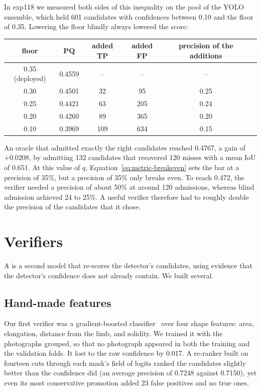 In exp118 we measured both sides of this inequality on the pool of the YOLO ensemble, which held 601
candidates with confidences between 0.10 and the floor of 0.35. Lowering the floor blindly always
lowered the score:
\begin{center}\small
\begin{tabular}{@{}cccccc@{}}
\toprule
floor & PQ & added TP & added FP & precision of the additions \\
\midrule
0.35 (deployed) & 0.4559 & -- & -- & -- \\
0.30 & 0.4501 & 32 & 95 & 0.25 \\
0.25 & 0.4421 & 63 & 205 & 0.24 \\
0.20 & 0.4260 & 89 & 365 & 0.20 \\
0.10 & 0.3969 & 109 & 634 & 0.15 \\
\bottomrule
\end{tabular}
\end{center}
An oracle that admitted exactly the right candidates reached 0.4767, a gain of $+0.0208$, by admitting
132 candidates that recovered 120 misses with a mean IoU of 0.651. At this value of $q$,
Equation~\eqref{eq:metric-breakeven} sets the bar at a precision of 35\%, but a precision of 35\%
only breaks even. To reach 0.472, the verifier needed a precision of about 50\% at around 120
admissions, whereas blind admission achieved 24 to 25\%. A useful verifier therefore had to roughly
double the precision of the candidates that it chose.

\section{Verifiers}\label{sec:recall-verifiers}
A  is a second model that re-scores the detector's candidates, using evidence that
the detector's confidence does not already contain. We built several.

\subsection{Hand-made features}\label{sec:recall-features}
Our first verifier was a gradient-boosted classifier~\citep{friedman2001} over four shape features: area, elongation,
distance from the limb, and solidity. We trained it with the photographs grouped, so that no
photograph appeared in both the training and the validation folds. It lost to the raw confidence by
0.017. A re-ranker built on fourteen cuts through each mask's field of logits ranked the candidates
slightly better than the confidence did (an average precision of 0.7248 against 0.7150), yet even its
most conservative promotion added 23 false positives and no true ones.

